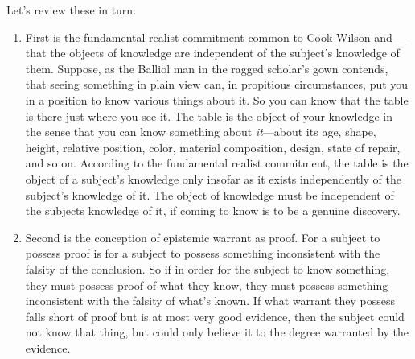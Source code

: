 \documentclass[12pt]{article}
\begin{document}
Let's review these in turn.

\begin{enumerate}[(1)]
	\item First is the fundamental realist commitment common to Cook Wilson and \citet{Moore:1903uo}\----that the objects of knowledge are independent of the subject's knowledge of them. Suppose, as the Balliol man in the ragged scholar's gown contends, that seeing something in plain view can, in propitious circumstances, put you in a position to know various things about it. So you can know that the table is there just where you see it. The table is the object of your knowledge in the sense that you can know something about \emph{it}---about its age, shape, height, relative position, color, material composition, design, state of repair, and so on. According to the fundamental realist commitment, the table is the object of a subject's knowledge only insofar as it exists independently of the subject's knowledge of it. The object of knowledge must be independent of the subjects knowledge of it, if coming to know is to be a genuine discovery.
	\item Second is the conception of epistemic warrant as proof. For a subject to possess proof is for a subject to possess something inconsistent with the falsity of the conclusion. So if in order for the subject to know something, they must possess proof of what they know, they must possess something inconsistent with the falsity of what's known. If what warrant they possess falls short of proof but is at most very good evidence, then the subject could not know that thing, but could only believe it to the degree warranted by the evidence.

\end{enumerate}
\end{document}
